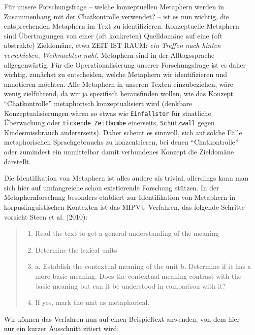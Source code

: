 \documentclass[
  letterpaper,
  DIV=11,
  numbers=noendperiod]{scrreprt}
\providecommand{\tightlist}{%
  \setlength{\itemsep}{0pt}\setlength{\parskip}{0pt}}\usepackage{longtable,booktabs,array}
\begin{document}
Für unsere Forschungsfrage -- welche konzeptuellen Metaphern werden in
Zusammenhang mit der Chatkontrolle verwendet? -- ist es nun wichtig, die
entsprechenden Metaphern im Text zu identifizieren. Konzeptuelle
Metaphern sind Übertragungen von einer (oft konkreten) Quelldomäne auf
eine (oft abstrakte) Zieldomäne, etwa ZEIT IST RAUM: \emph{ein Treffen
nach hinten verschieben, Weihnachten naht}. Metaphern sind in der
Alltagssprache allgegenwärtig. Für die Operationalisierung unserer
Forschungsfrage ist es daher wichtig, zunächst zu entscheiden, welche
Metaphern wir identifizieren und annotieren möchten. Alle Metaphern in
unseren Texten einzubeziehen, wäre wenig zielführend, da wir ja
spezifisch herausfinden wollen, wie das Konzept ``Chatkontrolle''
metaphorisch konzeptualisiert wird (denkbare Konzeptualisierungen wären
so etwas wie \texttt{Einfallstor} für staatliche Überwachung oder
\texttt{tickende\ Zeitbombe} einerseits, \texttt{Schutzwall} gegen
Kindesmissbrauch andererseits). Daher scheint es sinnvoll, sich auf
solche Fälle metaphorischen Sprachgebrauchs zu konzentrieren, bei denen
``Chatkontrolle'' oder zumindest ein unmittelbar damit verbundenes
Konzept die Zieldomäne darstellt.

Die Identifikation von Metaphern ist alles andere als trivial,
allerdings kann man sich hier auf umfangreiche schon existierende
Forschung stützen. In der Metaphernforschung besonders etabliert zur
Identifikation von Metaphern in korpuslinguistischen Kontexten ist das
MIPVU-Verfahren, das folgende Schritte vorsieht Steen et al. (2010):

\begin{quote}
\begin{enumerate}
\def\labelenumi{\arabic{enumi}.}
\tightlist
\item
  Read the text to get a general understanding of the meaning
\item
  Determine the lexical units
\item
  a. Establish the contextual meaning of the unit b. Determine if it has
  a more basic meaning. Does the contextual meaning contrast with the
  basic meaning but can it be understood in comparison with it?
\item
  If yes, mark the unit as metaphorical.
\end{enumerate}
\end{quote}

Wir können das Verfahren nun auf einen Beispieltext anwenden, von dem
hier nur ein kurzer Ausschnitt zitiert wird:
\end{document}
